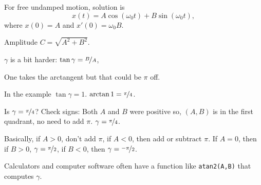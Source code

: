 \documentclass[10pt,aspectratio=169]{beamer}
\begin{document}
\begin{frame}
For free undamped motion, solution is
\begin{equation*}
x(t) = A \cos (\omega_0 t) + B \sin (\omega_0 t) ,
\end{equation*}
where $x(0) = A$ and $x'(0) = \omega_0 B$.

\medskip
\pause

Amplitude $C = \sqrt{A^2+B^2}$.

\medskip
\pause

$\gamma$ is a bit harder: $\tan \gamma = \nicefrac{B}{A}$, 

\pause

One takes the arctangent but that could be $\pi$ off.

\medskip
\pause

In the example $\tan \gamma = 1$.  \quad $\arctan 1 = \nicefrac{\pi}{4}$.

\medskip
\pause

Is $\gamma = \nicefrac{\pi}{4}$? \pause  Check signs: Both $A$ and $B$ were
positive so, $(A,B)$ is in the first quadrant, no need to add $\pi$.
\pause
$\gamma = \nicefrac{\pi}{4}$.

\medskip
\pause

Basically, if $A > 0$, don't add $\pi$, if $A < 0$, then add or subtract
$\pi$. \pause
If $A = 0$, then if $B > 0$, $\gamma = \nicefrac{\pi}{2}$, if
$B < 0$, then $\gamma =\nicefrac{-\pi}{2}$.

\medskip
\pause

Calculators and computer software often have a function like
\texttt{atan2(A,B)} that computes $\gamma$.

\end{frame}
\end{document}
